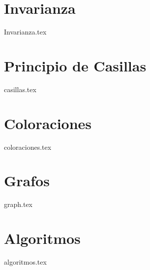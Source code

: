 \chapter{Invarianza}
{Invarianza.tex}

\chapter{Principio de Casillas}
{casillas.tex}

\chapter{Coloraciones}
{coloraciones.tex}


\chapter{Grafos}
{graph.tex}

\chapter{Algoritmos}
{algoritmos.tex}